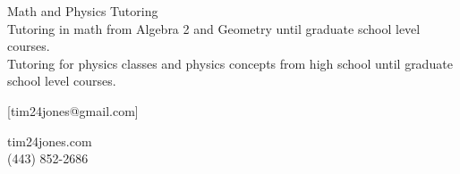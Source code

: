 \documentclass[letterpaper]{memoir}
\begin{document}
\thispagestyle{empty} \pagestyle{empty}
\begin{center}
{\HUGE Math and Physics Tutoring}\\
\vspace*{1.5in}
{\LARGE Tutoring in math from Algebra 2 and Geometry until graduate school level courses.}\\
\vspace*{0.5in}
{\LARGE Tutoring for physics classes and physics concepts from high school until graduate school level courses.}
\end{center}
\stubs[10]{3cm}[{tim24jones@gmail.com}]%
  {\raggedright tim24jones.com \\ (443) 852-2686}
\end{document}
